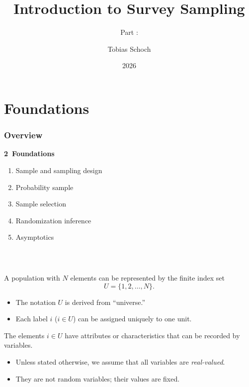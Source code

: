 \documentclass{my_eth_beamer}
\title{Introduction to Survey Sampling}
\subtitle{Part \NR: \TITLE}
\author[Tobias Schoch]{Tobias Schoch}
\date{2026}
\numberwithin{equation}{section}
\newcommand{\TITLE}{Foundations}
\newcommand{\NR}{2}
\begin{document}

\section{\TITLE}\label{sec:basics}
\setcounter{section}{\NR}
\setcounter{Bsp}{1}

\begin{frame}
    \frametitle{Overview}
    \noindent \hspace{0.2em}\textcolor{fhnwblue}{\bfseries \NR~\TITLE}
    \begin{enumerate}[\NR.1]
        \item Sample and sampling design
        \item Probability sample
        \item Sample selection
        \item Randomization inference
        \item Asymptotics
    \end{enumerate}
\end{frame}

\begin{frame}
    \frametitle{\insertsectionnumber~\insertsection}
    A \alert{population} with $N$ elements can be represented by the
    \alert{finite} index set
    \begin{equation*}
        U = \{1, 2, \ldots, N\}.
    \end{equation*}
    \vspace{-1.25em}
    \begin{itemize}
    \setlength{\itemsep}{4pt}
        \item The notation $U$ is derived from ``universe.''
        \item Each label $i$ ($i \in U$) can be assigned \alert{uniquely} to
            one unit.
    \end{itemize}
    \vspace{0.5em}
    The elements $i \in U$ have attributes or characteristics that can be
    recorded by \alert{variables}.
    \vspace{0.25em}
    \begin{itemize}
    \setlength{\itemsep}{4pt}
        \item Unless stated otherwise, we assume that all variables are
            \emph{real-valued}.
        \item They are \alert{not random variables}; their values are fixed.
    \end{itemize}
\end{frame}
\end{document}
